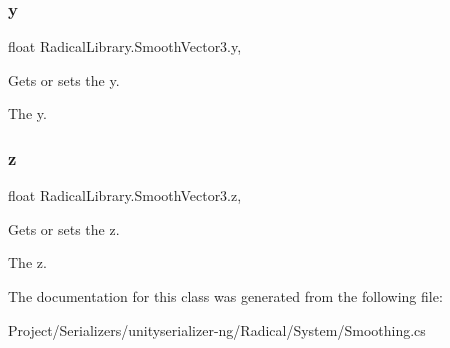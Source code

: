 \subsubsection{\texorpdfstring{y}{y}}
{\footnotesize\ttfamily float Radical\+Library.\+Smooth\+Vector3.\+y\hspace{0.3cm}{\ttfamily [get]}, {\ttfamily [set]}}



Gets or sets the y. 

The y.\mbox{\label{class_radical_library_1_1_smooth_vector3_accb3594d643d55a1edfde5c957602914}} 
\subsubsection{\texorpdfstring{z}{z}}
{\footnotesize\ttfamily float Radical\+Library.\+Smooth\+Vector3.\+z\hspace{0.3cm}{\ttfamily [get]}, {\ttfamily [set]}}



Gets or sets the z. 

The z.

The documentation for this class was generated from the following file\+:\begin{DoxyCompactItemize}
\item 
Project/\+Serializers/unityserializer-\/ng/\+Radical/\+System/Smoothing.\+cs\end{DoxyCompactItemize}
